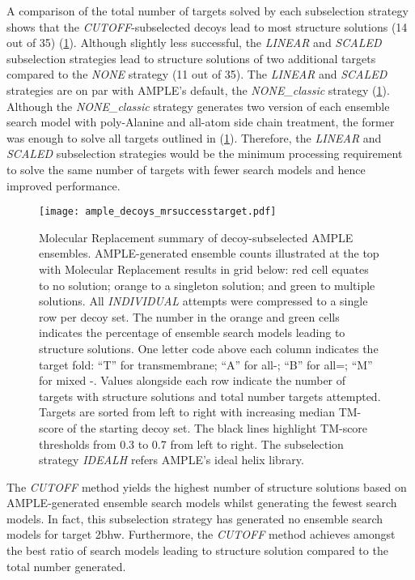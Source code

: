 A comparison of the total number of targets solved by each subselection strategy shows that the \textit{CUTOFF}-subselected decoys lead to most structure solutions (14 out of 35) (\cref{fig:ample_decoys_mrsuccesstarget}). Although slightly less successful, the \textit{LINEAR} and \textit{SCALED} subselection strategies lead to structure solutions of two additional targets compared to the \textit{NONE} strategy (11 out of 35). The \textit{LINEAR} and \textit{SCALED} strategies are on par with AMPLE's default, the \textit{NONE\_classic} strategy (\cref{fig:ample_decoys_mrsuccesstarget}). Although the \textit{NONE\_classic} strategy generates two version of each ensemble search model with poly-Alanine and all-atom side chain treatment, the former was enough to solve all targets outlined in (\cref{fig:ample_decoys_mrsuccesstarget}). Therefore, the \textit{LINEAR} and \textit{SCALED} subselection strategies would be the minimum processing requirement to solve the same number of targets with fewer search models and hence improved performance.

\begin{figure}[H]
    \centering
    \texttt{[image: ample\_decoys\_mrsuccesstarget.pdf]}
\caption[Molecular Replacement summary of decoy-subselected ensembles]{Molecular Replacement summary of decoy-subselected AMPLE ensembles. AMPLE-generated ensemble counts illustrated at the top with Molecular Replacement results in grid below: red cell equates to no solution; orange to a singleton solution; and green to multiple solutions. All \textit{INDIVIDUAL} attempts were compressed to a single row per decoy set. The number in the orange and green cells indicates the percentage of ensemble search models leading to structure solutions. One letter code above each column indicates the target fold: ``T'' for transmembrane; ``A'' for all-\textalpha; ``B'' for all=\textbeta; ``M'' for mixed \textalpha-\textbeta. Values alongside each row indicate the number of targets with structure solutions and total number targets attempted. Targets are sorted from left to right with increasing median TM-score of the starting decoy set. The black lines highlight TM-score thresholds from 0.3 to 0.7 from left to right. The subselection strategy \textit{IDEALH} refers AMPLE's ideal helix library.}
    \label{fig:ample_decoys_mrsuccesstarget}
\end{figure}

The \textit{CUTOFF} method yields the highest number of structure solutions based on AMPLE-generated ensemble search models whilst generating the fewest search models. In fact, this subselection strategy has generated no ensemble search models for target 2bhw. Furthermore, the \textit{CUTOFF} method achieves amongst the best ratio of search models leading to structure solution compared to the total number generated. 

